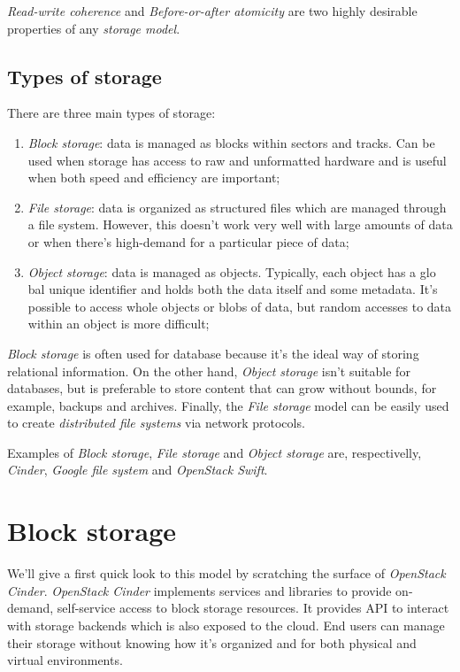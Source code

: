 \noindent
\emph{Read-write coherence} and \emph{Before-or-after atomicity} are two highly
desirable properties of any \emph{storage model}.

\subsection{Types of storage}
There are three main types of storage:
\begin{enumerate}
    \item \emph{Block storage}: data is managed as blocks within sectors and
    tracks. Can be used when storage has access to raw and unformatted hardware
    and is useful when both speed and efficiency are important;
    \item \emph{File storage}: data is organized as structured files which are
    managed through a file system. However, this doesn't work very well with
    large amounts of data or when there's high-demand for a particular piece
    of data;
    \item \emph{Object storage}: data is managed as objects. Typically, each
    object has a glo    bal unique identifier and holds both the data itself and
    some metadata. It's possible to access whole objects or blobs of data, but
    random accesses to data within an object is more difficult;
\end{enumerate}

\noindent
\emph{Block storage} is often used for database because it's the ideal way of
storing relational information. On the other hand, \emph{Object storage} isn't
suitable for databases, but is preferable to store content that can grow without
bounds, for example, backups and archives. Finally, the \emph{File storage} model
can be easily used to create \emph{distributed file systems} via network protocols.

Examples of \emph{Block storage}, \emph{File storage} and \emph{Object storage}
are, respectivelly, \emph{Cinder}, \emph{Google file system} and \emph{OpenStack
Swift}.

\section{Block storage}
We'll give a first quick look to this model by scratching the surface of
\emph{OpenStack Cinder}. \emph{OpenStack Cinder} implements services and libraries
to provide on-demand, self-service access to block storage resources. It provides
API to interact with storage backends which is also exposed to the cloud. End
users can manage their storage without knowing how it's organized and for both
physical and virtual environments.

